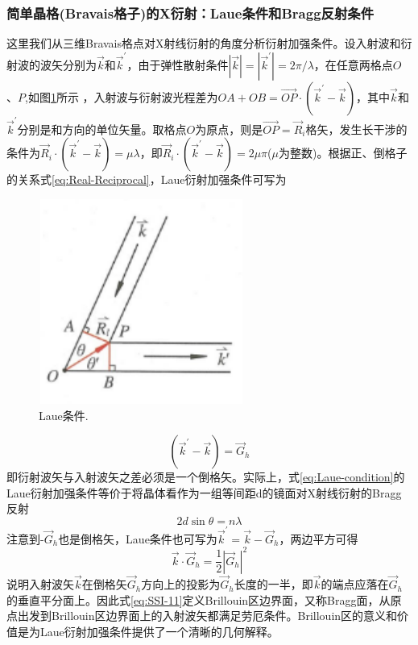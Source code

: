 \subsubsection{简单晶格(Bravais格子)的X衍射：Laue条件和Bragg反射条件} 
这里我们从三维Bravais格点对X射线衍射的角度分析衍射加强条件。设入射波和衍射波的波矢分别为$\vec k$和$\vec k^{\prime}$，由于弹性散射条件$|\vec k|=|\vec k^{\prime}|=2\pi/\lambda$，在任意两格点$O$、$P$,如图\ref{Fig:Laue_condition}所示 ，入射波与衍射波光程差为$OA+OB=\vec{OP}\cdot(\vec k^{\prime}-\vec k)$，其中$\vec k$和$\vec k^{\prime}$分别是和方向的单位矢量。取格点$O$为原点，则是$\vec{OP}=\vec R_i$格矢，发生长干涉的条件为$\vec R_i\cdot(\vec k^{\prime}-\vec k)=\mu\lambda$，即$\vec R_i\cdot(\vec k^{\prime}-\vec k)=2\mu\pi$($\mu$为整数)。根据正、倒格子的关系式\eqref{eq:Real-Reciprocal}，Laue衍射加强条件可写为
\begin{figure}[h!]
\centering
\vspace*{-0.05in}
\includegraphics[height=2.65in,width=2.65in,viewport=0 0 40 40,clip]{Figures/Laue_condition.png}
\caption{\small \textrm{Laue条件.}}%
\label{Fig:Laue_condition}
\end{figure}
\begin{equation}
	(\vec k^{\prime}-\vec k)=\vec G_h
	\label{eq:Laue-condition}
\end{equation} 
即衍射波矢与入射波矢之差必须是一个倒格矢。实际上，式\eqref{eq:Laue-condition}的Laue衍射加强条件等价于将晶体看作为一组等间距d的镜面对X射线衍射的Bragg反射%
\begin{equation}
	2d\sin\theta=n\lambda
	\label{eq:Bragg-condition}
\end{equation}
注意到-$\vec G_h$也是倒格矢，Laue条件也可写为$\vec k^{\prime}=\vec k-\vec G_h$，两边平方可得
\begin{equation}
	\vec k\cdot\vec G_h=\dfrac12|\vec G_h|^2
	\label{eq:SSI-11}
\end{equation} 
说明入射波矢$\vec k$在倒格矢$\vec G_h$方向上的投影为$\vec G_h$长度的一半，即$\vec k$的端点应落在$\vec G_h$的垂直平分面上。因此式\eqref{eq:SSI-11}定义Brillouin区边界面，又称Bragg面，从原点出发到Brillouin区边界面上的入射波矢都满足劳厄条件。Brillouin区的意义和价值是为Laue衍射加强条件提供了一个清晰的几何解释。

